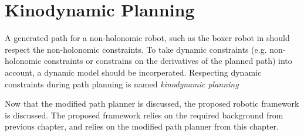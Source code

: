 \section{Kinodynamic Planning}
A generated path for a non-holonomic robot, such as the boxer robot in  should respect the non-holonomic constraints. To take dynamic constraints (e.g. non-holonomic constraints or constrains on the derivatives of the planned path) into account, a dynamic model should be incorperated. Respecting dynamic constraints during path planning is named \textit{kinodynamic planning} 











Now that the modified path planner is discussed, the proposed robotic framework is discussed. The proposed framework relies on the required background from previous chapter, and relies on the modified path planner from this chapter.\bs







